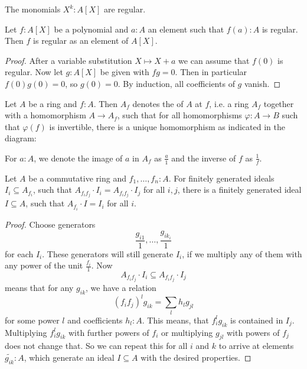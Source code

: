 \begin{example}
  The monomials $X^k:A[X]$ are regular.
\end{example}

\begin{lemma}%
  \label{polynomial-with-regular-value-is-regular}
  Let $f : A[X]$ be a polynomial
  and $a : A$ an element
  such that $f(a) : A$ is regular.
  Then $f$ is regular as an element of $A[X]$.
\end{lemma}

\begin{proof}
  After a variable substitution $X \mapsto X + a$
  we can assume that $f(0)$ is regular.
  Now let $g : A[X]$ be given with $fg = 0$.
  Then in particular $f(0) g(0) = 0$,
  so $g(0) = 0$.
  By induction,
  all coefficients of $g$ vanish.
\end{proof}

\begin{definition}
  Let $A$ be a ring and $f:A$.
  Then $A_{f}$ denotes the  of $A$ at $f$,
  i.e. a ring $A_f$ together with a homomorphism $A\to A_f$,
  such that for all homomorphisms $\varphi:A\to B$ such that
  $\varphi(f)$ is invertible, there is a unique homomorphism as indicated in the diagram:
  \begin{center}
  \end{center}
  For $a:A$, we denote the image of $a$ in $A_f$ as $\frac{a}{1}$ and the inverse of $f$ as $\frac{1}{f}$.
\end{definition}

\begin{lemma}%
  \label{fg-ideal-local-global}
  Let $A$ be a commutative ring and $f_1,\dots,f_n:A$.
  For finitely generated ideals $I_i\subseteq A_{f_i}$,
  such that $A_{f_if_j}\cdot I_i=A_{f_if_j}\cdot I_j$ for all $i,j$,
  there is a finitely generated ideal $I\subseteq A$,
  such that $A_{f_i}\cdot I=I_i$ for all $i$.
\end{lemma}

\begin{proof}
  Choose generators 
  \[ \frac{g_{i1}}{1},\dots,\frac{g_{ik_i}}{1} \]
  for each $I_i$.
  These generators will still generate $I_i$, if we multiply any of them with any power of the unit $\frac{f_i}{1}$.
  Now
  \[ A_{f_if_j}\cdot I_i\subseteq A_{f_if_j}\cdot I_j \]
  means that for any $g_{ik}$, we have a relation
  \[ (f_if_j)^l g_{ik}=\sum_{l}h_{l}g_{jl}\]
  for some power $l$ and coefficients $h_{l}:A$.
  This means, that $f_i^lg_{ik}$ is contained in $I_j$.
  Multiplying $f_i^lg_{ik}$ with further powers of $f_i$ or multiplying $g_{jl}$ with powers of $f_j$ does not change that.
  So we can repeat this for all $i$ and $k$ to arrive at elements $\tilde{g_{ik}}:A$,
  which generate an ideal $I\subseteq A$ with the desired properties.
\end{proof}

